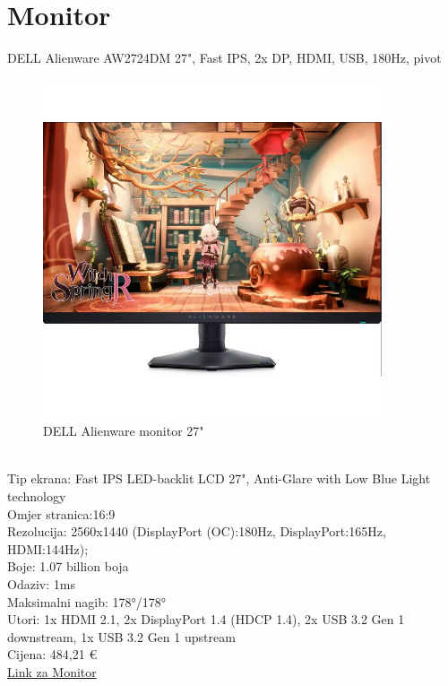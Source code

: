 \documentclass{article}
\begin{document}
\section{Monitor}
DELL Alienware AW2724DM 27", Fast IPS, 2x DP, HDMI, USB, 180Hz, pivot
\begin{figure}[h]
    \includegraphics[width=10cm]{monitor.jpg}
    \caption{DELL Alienware monitor 27"}
\end{figure}\\
Tip ekrana: Fast IPS LED-backlit LCD 27", Anti-Glare with Low Blue Light technology\\
Omjer stranica:16:9\\
Rezolucija:  2560x1440 (DisplayPort (OC):180Hz, DisplayPort:165Hz, HDMI:144Hz);\\
Boje: 1.07 billion boja\\
Odaziv: 1ms\\
Maksimalni nagib: 178°/178°\\
Utori: 1x HDMI 2.1, 2x DisplayPort 1.4 (HDCP 1.4), 2x USB 3.2 Gen 1 downstream, 1x USB 3.2 Gen 1 upstream\\
Cijena: 484,21 €\\
\href{https://www.adm.hr/dell-alienware-aw2724dm-27-fast-ips-2x-dp-hdmi-usb-144hz-pivot/78256/product/}{Link za Monitor}
\newpage
\end{document}
